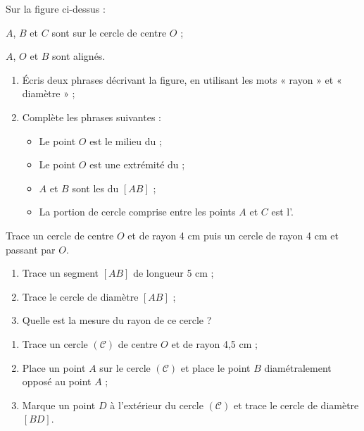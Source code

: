 \begin{exercice}[Vocabulaire]
 \begin{center}
 \end{center}
 Sur la figure ci-dessus : 
 
$A$, $B$ et $C$ sont sur le cercle de centre $O$ ;

$A$, $O$ et $B$ sont alignés.
 \begin{enumerate}
  \item Écris deux phrases décrivant la figure, en utilisant les mots « rayon » et « diamètre » ;
  \item Complète les phrases suivantes :
   \begin{itemize}
    \item Le point $O$ est le milieu du \dotfill ;
    \item Le point $O$ est une extrémité du \dotfill ;
    \item $A$ et $B$ sont les \dotfill du \dotfill $[AB]$ ;
    \item La portion de cercle comprise entre les points $A$ et $C$ est l'\dotfill.
    \end{itemize}
  \end{enumerate}
\end{exercice}


\begin{exercice}
Trace un cercle de centre $O$ et de rayon 4 cm puis un cercle de rayon 4 cm et passant par $O$.
\end{exercice}


\begin{exercice}
 \begin{enumerate}
  \item Trace un segment $[AB]$ de longueur 5 cm ;
  \item Trace le cercle de diamètre $[AB]$ ;
  \item Quelle est la mesure du rayon de ce cercle ?
  \end{enumerate}
\end{exercice}



\begin{exercice}[Construction]
 \begin{enumerate}
  \item Trace un cercle $(\mathcal{C})$ de centre $O$ et de rayon 4,5 cm ;
  \item Place un point $A$ sur le cercle $(\mathcal{C})$ et place le point $B$ diamétralement opposé au point $A$ ;
  \item Marque un point $D$ à l'extérieur du cercle $(\mathcal{C})$ et trace le cercle de diamètre $[BD]$.
 \end{enumerate}
\end{exercice}



